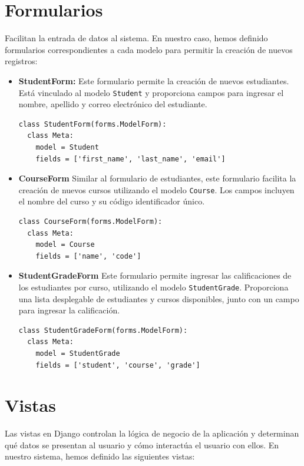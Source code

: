 \documentclass[10pt, a4paper]{article}
\newcommand{\mpy}[1]{\texttt{#1}}
\begin{document}
\section{Formularios}
Facilitan la entrada de datos al sistema. En nuestro caso, hemos definido formularios correspondientes a cada modelo para permitir la creación de nuevos registros:

\begin{itemize}
  \item \textbf{StudentForm:} Este formulario permite la creación de nuevos estudiantes. Está vinculado al modelo \mpy{Student} y proporciona campos para ingresar el nombre, apellido y correo electrónico del estudiante.

\begin{verbatim}
class StudentForm(forms.ModelForm):
  class Meta:
    model = Student
    fields = ['first_name', 'last_name', 'email']
\end{verbatim}

  \item \textbf{CourseForm} Similar al formulario de estudiantes, este formulario facilita la creación de nuevos cursos utilizando el modelo \mpy{Course}. Los campos incluyen el nombre del curso y su código identificador único.

\begin{verbatim}
class CourseForm(forms.ModelForm):
  class Meta:
    model = Course
    fields = ['name', 'code']
\end{verbatim}

  \item \textbf{StudentGradeForm} Este formulario permite ingresar las calificaciones de los estudiantes por curso, utilizando el modelo \mpy{StudentGrade}. Proporciona una lista desplegable de estudiantes y cursos disponibles, junto con un campo para ingresar la calificación.

\begin{verbatim}
class StudentGradeForm(forms.ModelForm):
  class Meta:
    model = StudentGrade
    fields = ['student', 'course', 'grade']
\end{verbatim}
\end{itemize}

\section{Vistas}
Las vistas en Django controlan la lógica de negocio de la aplicación y determinan qué datos se presentan al usuario y cómo interactúa el usuario con ellos. En nuestro sistema, hemos definido las siguientes vistas:
\end{document}
